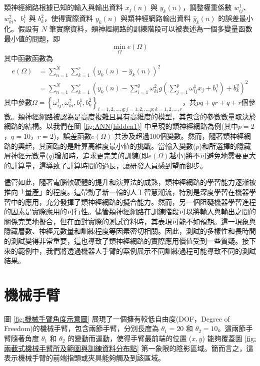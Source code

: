 \documentclass[12pt, a4paper]{article}
\begin{document}
類神經網路根據已知的輸入與輸出資料 $x_j(n)$ 與 $y_k(n)$，調整權重係數 $w^1_{ij}$、$w^2_{ki}$、$b^1_i$ 與 $b^2_k$，使得實際資料 $y_k(n)$ 與類神經網路輸出資料 $\hat{y}_k(n)$ 的誤差最小化。假設有 $N$ 筆實際資料，類神經網路的訓練階段可以被表述為一個多變量函數最小值的問題，即
\begin{equation}\label{eq:ANN-3}
\min_{\Omega} e(\Omega)
\end{equation}
其中函數函數為
\begin{align}\label{eq:ANN-4}\nonumber
e(\Omega)&=\sum_{n=1}^N\sum_{k=1}^r\left(y_k(n)-\hat{y}_k(n)\right)^2 \\
&=\sum_{n=1}^N\sum_{k=1}^r\left(y_k(n)-\sum_{i=1}^q\omega^2_{ki}g\left(\sum_{j=1}^p\omega^1_{ij}x_j+b^1_i\right)+b^2_k\right)^2
\end{align}
其中參數$\Omega=\left\{\omega^1_{ij},\omega^2_{ki},b^1_i,b^2_k \right\}_{i=1,2,\dots,q;j=1,2,\dots,p;k=1,2,\dots,r}$，共$pq+qr+q+r$個參數。類神經網路被認為是高度複雜且具有高維度的模型，其包含的參數數量取決於網路的結構。以我們在圖 \ref{fig:ANN(hidden1)} 中呈現的類神經網路為例(其中$p=2$，$q=10$，$r=2$)，誤差函數$e(\Omega)$ 共涉及超過100個變數。然而，隨著類神經網路的興起，其面臨的是計算高維度最小值的挑戰。當輸入變數($p$)和所選擇的隱藏層神經元數量($q$)增加時，追求更完美的訓練(即$e(\Omega)$越小)將不可避免地需要更大的計算量，這導致了計算時間的過長，讓研發人員感到望而卻步。

儘管如此，隨著電腦軟硬體的提升和演算法的成熟，類神經網路的學習能力逐漸被推向「量產」的程度。這帶動了新一輪的人工智慧潮流，特別是深度學習在機器學習中的應用，充分發揮了類神經網路的擬合能力。然而，另一個阻礙機器學習進程的因素是實際應用的可行性。儘管類神經網路在訓練階段可以將輸入與輸出之間的關係完美地擬合，但在面對實際的測試資料時，其表現可能不如預期。這一現象與隱藏層數、神經元數量和訓練程度等因素密切相關。因此，測試的多樣性和長時間的測試變得非常重要，這也導致了類神經網路的實際應用價值受到一些質疑。接下來的範例中，我們將透過機器人手臂的案例展示不同訓練過程可能導致不同的測試結果。
\section{機械手臂}
圖 \ref{fig:機械手臂角度示意圖} 展現了一個擁有較低自由度(DOF，Degree of Freedom)的機械手臂，包含兩節手臂，分別長度為 $\theta _1 = 20$ 和 $\theta _2 = 10$。這兩節手臂隨著角度 $\theta _1$ 和 $\theta _2$ 的變動而運動，使得手臂最前端的位置 ($x, y$) 能夠覆蓋圖 \ref{fig:兩截式機械手臂所及範圍與訓練資料分布點} 第一象限的陰影區域。簡而言之，這表示機械手臂的前端指頭或夾具能夠觸及到該區域。
\end{document}
